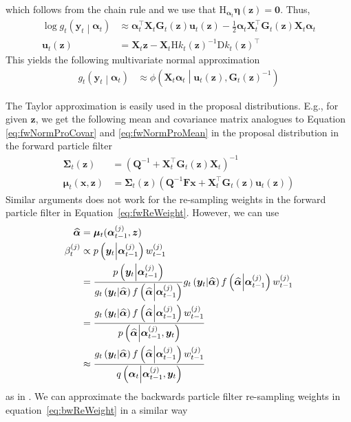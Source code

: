 \documentclass[notitlepage]{article}
\renewcommand{\vec}[1]{\bm{#1}}
\newcommand{\mat}[1]{\mathbf{#1}}
\newcommand{\Lparen}[1]{\left( #1\right)}
\newcommand{\Cond}[2]{ #1 \middle\vert  #2}
\newcommand{\optor}[2]{#1\Lparen{#2}}
\newcommand{\optorC}[3]{\optor{#1}{\Cond{#2}{#3}}}
\newcommand{\pdensC}[2]{\optorC{p}{#1}{#2}}
\newcommand{\normaldC}[3]{\optorC{\phi}{#1}{#2,#3}}
\newcommand{\IDC}[2]{\optorC{q}{#1}{#2}}
\newcommand{\partic}[3]{#1_{#2}^{\Lparen{#3}}}
\newcommand\Jaco{\mathrm D}
\newcommand\Hess{\mathrm H}
\begin{document}
%
which follows from the chain rule and we use that %
$\Hess_{\vec\alpha_t}\vec\eta(\vec z) = \mat 0$. Thus, %
%
\begin{align*}
\log\optorC{g_t}{\vec{y}_t}{\vec\alpha_t} &\approx 
	\vec\alpha_t^\top\mat X_t\mat G_t(\vec z)\vec u_t(\vec z)
	- \frac 12 \vec\alpha_t\mat X_t^\top
	\mat G_t(\vec z)\mat X_t\vec\alpha_t \\
\vec u_t(\vec z) &= 
	\mat X_t\vec z - \mat X_t\Hess k_t(\vec z)^{-1}\Jaco k_t(\vec z)^\top
\end{align*}
%
This yields the following multivariate normal approximation %
%
\begin{align*}
\optorC{g_t}{\vec{y}_t}{\vec\alpha_t} &\approx 
	\normaldC{\mat X_t\vec\alpha_t}{\vec u_t(\vec z)}{\mat G_t(\vec z)^{-1}}
\end{align*}

The Taylor approximation is easily used in the proposal distributions. E.g., for given $\vec z$, we get the following mean and covariance matrix analogues to Equation \eqref{eq:fwNormProCovar} and \eqref{eq:fwNormProMean} in the proposal distribution in the forward particle filter %
%
\begin{align*}
\mat\Sigma_t(\vec z) &= \Lparen{\mat Q^{-1} + \mat X_t^\top
	\mat G_t(\vec z)\mat X_t}^{-1} \\
\vec\mu_t(\vec x, \vec z) &= \mat\Sigma_t(\vec z)\Lparen{
	\mat Q^{-1}\mat F\vec x + \mat X^\top_t\mat G_t(\vec z)
	\vec u_t(\vec z)}
\end{align*}%
% 
Similar arguments does not work for the re-sampling weights
in the
 forward particle filter in Equation~\eqref{eq:fwReWeight}. However, we can use%
%
\begin{align*}
\widehat{\vec\alpha} &= \vec\mu_t(\partic{\vec\alpha}{t-1}j, \vec z) \\
\partic\beta tj &\propto 
	\pdensC{\vec y_t}{\partic{\vec\alpha}{t-1}j}\partic w{t-1}j \\
	&= \frac{ %
		\pdensC{\vec y_t}{\partic{\vec\alpha}{t-1}j}
	}{%
		\optorC{g_t}{\vec{y}_t}{\widehat{\vec\alpha}}
		\optorC{f}{\widehat{\vec\alpha}}{\partic{\vec\alpha}{t-1}j}
	}
	\optorC{g_t}{\vec{y}_t}{\widehat{\vec\alpha}}
	\optorC{f}{\widehat{\vec\alpha}}{\partic{\vec\alpha}{t-1}j}
	\partic w{t-1}j \\
	&= \frac{ %
		\optorC{g_t}{\vec{y}_t}{\widehat{\vec\alpha}}
		\optorC{f}{\widehat{\vec\alpha}}{\partic{\vec\alpha}{t-1}j}
		\partic w{t-1}j
	}{%
		\pdensC{\widehat{\vec\alpha}}{
		\partic{\vec\alpha}{t-1}j, \vec y_t}
	} \\
	&\approx
	\frac{ %
		\optorC{g_t}{\vec{y}_t}{\widehat{\vec\alpha}}
		\optorC{f}{\widehat{\vec\alpha}}{\partic{\vec\alpha}{t-1}j}
		\partic w{t-1}j
	}{%
		\IDC{\vec\alpha_t}{\partic{\vec\alpha}{t-1}j, \vec y_t}
	}
\end{align*}
%
as in \cite{fearnhead10}. We can approximate the backwards particle filter re-sampling weights in equation~\eqref{eq:bwReWeight} in a similar way
\end{document}
